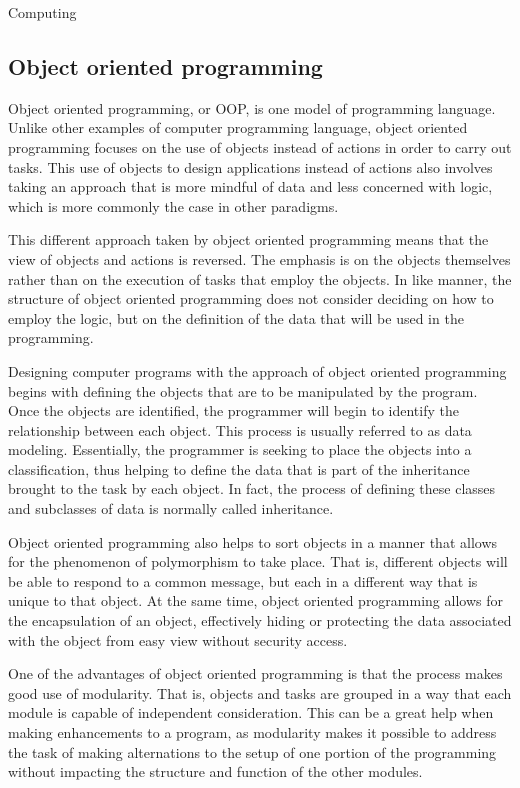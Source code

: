 
Computing


\subsection*{Object oriented programming}

Object oriented programming, or OOP, is one model of programming language. Unlike other examples of computer programming language, object oriented programming focuses on the use of objects instead of actions in order to carry out tasks. This use of objects to design applications instead of actions also involves taking an approach that is more mindful of data and less concerned with logic, which is more commonly the case in other paradigms.


This different approach taken by object oriented programming means that the view of objects and actions is reversed. The emphasis is on the objects themselves rather than on the execution of tasks that employ the objects. In like manner, the structure of object oriented programming does not consider deciding on how to employ the logic, but on the definition of the data that will be used in the programming.


Designing computer programs with the approach of object oriented programming begins with defining the objects that are to be manipulated by the program. Once the objects are identified, the programmer will begin to identify the relationship between each object. This process is usually referred to as data modeling. Essentially, the programmer is seeking to place the objects into a classification, thus helping to define the data that is part of the inheritance brought to the task by each object. In fact, the process of defining these classes and subclasses of data is normally called inheritance.


Object oriented programming also helps to sort objects in a manner that allows for the phenomenon of polymorphism to take place. That is, different objects will be able to respond to a common message, but each in a different way that is unique to that object. At the same time, object oriented programming allows for the encapsulation of an object, effectively hiding or protecting the data associated with the object from easy view without security access.


One of the advantages of object oriented programming is that the process makes good use of modularity. That is, objects and tasks are grouped in a way that each module is capable of independent consideration. This can be a great help when making enhancements to a program, as modularity makes it possible to address the task of making alternations to the setup of one portion of the programming without impacting the structure and function of the other modules.

